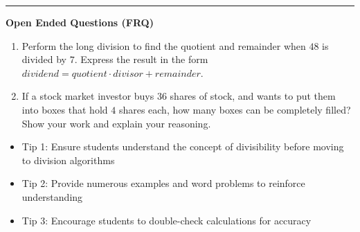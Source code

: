 \documentclass[10pt]{article}
\begin{document}
\vspace{-0.2cm}
\hrule
\vspace{0.2cm}
\textbf{\small Open Ended Questions (FRQ)}
\begin{enumerate}[label=\textbf{Q\arabic*.}, start=9, itemsep=5pt, topsep=0pt]

  \item \small Perform the long division to find the quotient and remainder when $48$ is divided by $7$. Express the result in the form $ dividend = quotient \cdot divisor + remainder $.  \vspace{2cm}

  \item \small If a stock market investor buys $36$ shares of stock, and wants to put them into boxes that hold $4$ shares each, how many boxes can be completely filled? Show your work and explain your reasoning. \vspace{2cm}

\end{enumerate}

\vfill

\begin{tcolorbox}[colback=blue!5, colframe=mainblue!50, title=\small \textbf{Chef's Tips}, fonttitle=\bfseries, bottom=1mm]
\begin{itemize}[noitemsep, topsep=2pt, leftmargin=0.5cm]
  \item \scriptsize Tip 1: Ensure students understand the concept of divisibility before moving to division algorithms\item \scriptsize Tip 2: Provide numerous examples and word problems to reinforce understanding\item \scriptsize Tip 3: Encourage students to double-check calculations for accuracy
\end{itemize}
\end{tcolorbox}
\end{document}
